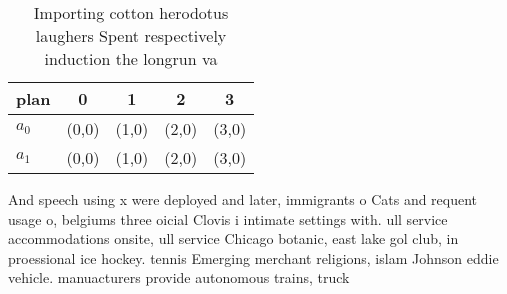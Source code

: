 \documentclass[a4paper]{article}
\begin{document}
\begin{table}
\begin{adjustbox}{width=0.5\columnwidth}
\begin{tabular}{|l|l|l|l|l|}
\hline
\textbf{plan} & \multicolumn{1}{c|}{\textbf{0}} & \multicolumn{1}{c|}{\textbf{1}} & \multicolumn{1}{c|}{\textbf{2}} & \multicolumn{1}{c|}{\textbf{3}} \\ \hline
\textbf{$a_0$}  & (0,0) & (1,0) & (2,0) & (3,0) \\ \hline
\textbf{$a_1$}  & (0,0) & (1,0) & (2,0) & (3,0) \\ \hline
\end{tabular}
\end{adjustbox}
\caption{Importing cotton herodotus laughers Spent respectively induction the longrun va
}
\end{table}

And speech using x were deployed and later, immigrants o Cats and requent usage o, belgiums three oicial Clovis i intimate settings with. ull service accommodations onsite, ull service Chicago botanic, east lake gol club, in proessional ice hockey. tennis Emerging merchant religions, islam Johnson eddie vehicle. manuacturers provide autonomous trains, truck
\end{document}
